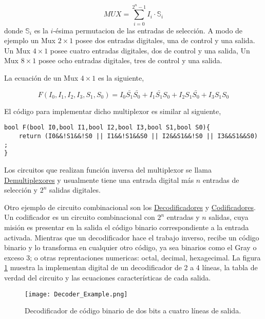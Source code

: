 \begin{equation}
MUX=\sum_{i=0}^{2^{n}-1} I_{i}\cdot \mathbb{S}_i
\end{equation}
donde $\mathbb{S}_i$  es la $i$-ésima permutacion de las entradas de selección. A modo de ejemplo un Mux $2 \times 1$
 posee dos entradas digitales, una de control y una salida. Un Mux $4 \times 1$ posee cuatro entradas digitales, dos de control y una salida, Un Mux $8 \times 1$ posee ocho entradas digitales, tres de control y una salida.
 
La ecuación de un Mux $4 \times 1$ es la siguiente,

\begin{equation}
	F(I_0,I_1,I_2,I_3,S_1,S_0)=I_0\bar{S_1}\bar{S_0}+I_1\bar{S_1}S_0+I_2S_1\bar{S_0}+I_3S_1S_0
\end{equation} 

El código para implementar dicho multiplexor es similar al siguiente,
{\footnotesize 
\begin{lstlisting}[language=Arduino,numbers=none, showstringspaces=false]
bool F(bool I0,bool I1,bool I2,bool I3,bool S1,bool S0){
	return (I0&&!S1&&!S0 || I1&&!S1&&S0 || I2&&S1&&!S0 || I3&&S1&&S0) ;
}
\end{lstlisting}
}
Los circuitos que realizan función inversa del multiplexor se  llama \href{https://es.wikipedia.org/wiki/Demultiplexor}{Demultiplexores}  y usualmente tiene una entrada digital más $n$ entradas de selección y $2^{n}$ salidas digitales.

Otro ejemplo de circuito combinacional son los \href{URL}{Decodificadores} y \href{https://es.wikipedia.org/wiki/Codificador}{Codificadores}.  Un codificador es un circuito combinacional con $2^{n}$ entradas y $n$ salidas, cuya misión es presentar en la salida el código binario correspondiente a la entrada activada. Mientras que un decodificador hace el trabajo inverso, recibe un código binario y lo transforma en cualquier otro código, ya sea  binarios como el Gray o exceso 3; o otras reprentaciones numericas: octal, decimal, hexagecimal. La figura \ref{fig:decoderexample} muestra la implementan digital de un decodificador de 2 a 4 líneas, la tabla de verdad del circuito y las ecuaciones características de cada salida. 
\begin{figure}
	\centering
	\texttt{[image: Decoder\_Example.png]}
	\caption{Decodificador de código binario de dos bits a cuatro líneas de salida.  }
	\label{fig:decoderexample}
\end{figure}

